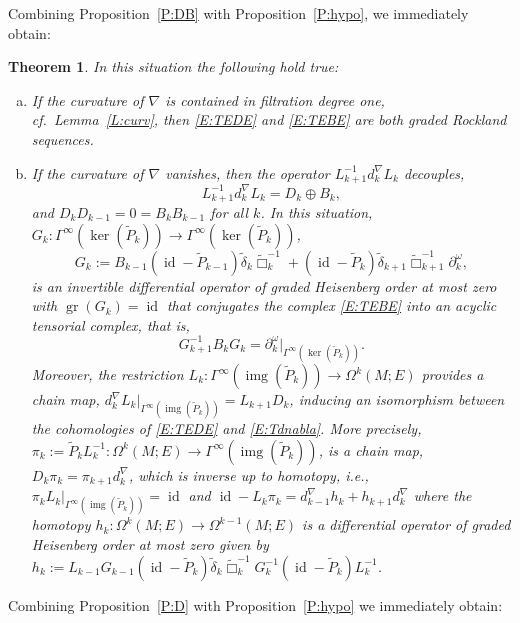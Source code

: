 \documentclass[reqno,12pt]{amsart}
\DeclareMathOperator{\img}{img}
\DeclareMathOperator{\gr}{gr}
\DeclareMathOperator{\id}{id}
\theoremstyle{plain}
\newtheorem{theorem}{Theorem}[section]
\theoremstyle{definition}
\begin{document}
Combining Proposition~\ref{P:DB} with Proposition~\ref{P:hypo}, we immediately obtain:


\begin{theorem}\label{T:D}
In this situation the following hold true:
\begin{enumerate}[(a)]
\item
If the curvature of $\nabla$ is contained in filtration degree one, cf.\ Lemma~\ref{L:curv}, then \eqref{E:TEDE} and \eqref{E:TEBE} are both graded Rockland sequences.
\item
If the curvature of\/ $\nabla$ vanishes, then the operator $L_{k+1}^{-1}d^\nabla_kL_k$ decouples,
$$
L^{-1}_{k+1}d^\nabla_kL_k=D_k\oplus B_k,
$$ 
and $D_kD_{k-1}=0=B_kB_{k-1}$ for all $k$.
In this situation, $G_k\colon\Gamma^\infty(\ker(\tilde P_k))\to\Gamma^\infty(\ker(\tilde P_k))$,
$$
G_k:=B_{k-1}(\id-\tilde P_{k-1})\tilde\delta_k\tilde\Box_k^{-1}
+(\id-\tilde P_k)\tilde\delta_{k+1}\tilde\Box_{k+1}^{-1}\partial^\omega_k,
$$ 
is an invertible differential operator of graded Heisenberg order at most zero with $\gr(G_k)=\id$ that conjugates the complex \eqref{E:TEBE} into an acyclic tensorial complex, that is, 
$$
G_{k+1}^{-1}B_kG_k=\partial^\omega_k|_{\Gamma^\infty(\ker(\tilde P_k))}.
$$
Moreover, the restriction $L_k\colon\Gamma^\infty(\img(\tilde P_k))\to\Omega^k(M;E)$ provides a chain map, $d^\nabla_kL_k|_{\Gamma^\infty(\img(\tilde P_k))}=L_{k+1}D_k$, inducing an isomorphism between the cohomologies of \eqref{E:TEDE} and \eqref{E:Tdnabla}.
More precisely, $\pi_k:=\tilde P_kL_k^{-1}\colon\Omega^k(M;E)\to\Gamma^\infty(\img(\tilde P_k))$, is a chain map, $D_k\pi_k=\pi_{k+1}d^\nabla_k$, which is inverse up to homotopy, i.e., $\pi_kL_k|_{\Gamma^\infty(\img(\tilde P_k))}=\id$ and $\id-L_k\pi_k=d^\nabla_{k-1}h_k+h_{k+1}d^\nabla_k$ where the homotopy $h_k\colon\Omega^k(M;E)\to\Omega^{k-1}(M;E)$ is a differential operator of graded Heisenberg order at most zero given by $h_k:=L_{k-1}G_{k-1}(\id-\tilde P_k)\tilde\delta_k\tilde\Box_k^{-1}G_k^{-1}(\id-\tilde P_k)L_k^{-1}$.
\end{enumerate}
\end{theorem}


Combining Proposition~\ref{P:D} with Proposition~\ref{P:hypo} we immediately obtain:
\end{document}
